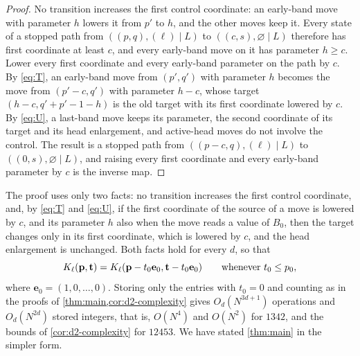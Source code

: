 \documentclass[11pt,reqno]{amsart}
\theoremstyle{definition}
\theoremstyle{remark}
\begin{document}
\begin{proof}
No transition increases the first control coordinate: an early-band move
with parameter $h$ lowers it from $p'$ to $h$, and the other moves keep it.
Every state of a stopped path from $((p,q),(\ell)\mid L)$ to
$((c,s),\varnothing\mid L)$ therefore has first coordinate at least $c$, and
every early-band move on it has parameter $h\geq c$.  Lower every first
coordinate and every early-band parameter on the path by $c$.  By
\eqref{eq:T}, an early-band move from $(p',q')$ with parameter $h$ becomes
the move from $(p'-c,q')$ with parameter $h-c$, whose target
$(h-c,q'+p'-1-h)$ is the old target with its first coordinate lowered by
$c$.  By \eqref{eq:U}, a last-band move keeps its parameter, the second
coordinate of its target and its head enlargement, and active-head moves do
not involve the control.  The result is a stopped path from
$((p-c,q),(\ell)\mid L)$ to $((0,s),\varnothing\mid L)$, and raising every
first coordinate and every early-band parameter by $c$ is the inverse map.
\end{proof}

The proof uses only two facts: no transition increases the first control
coordinate, and, by \eqref{eq:T} and \eqref{eq:U}, if the first coordinate
of the source of a move is lowered by $c$, and its parameter $h$ also when
the move reads a value of $B_0$, then the target changes only in its first
coordinate, which is lowered by $c$, and the head enlargement is unchanged.
Both facts hold for every $d$, so that
\[
 K_\ell(\mathbf p,\mathbf t)
 =K_\ell(\mathbf p-t_0\mathbf e_0,\mathbf t-t_0\mathbf e_0)
 \qquad\hbox{whenever }t_0\leq p_0,
\]
where $\mathbf e_0=(1,0,\ldots,0)$.  Storing only the entries with $t_0=0$
and counting as in the proofs of \cref{thm:main,cor:d2-complexity} gives
$O_d(N^{3d+1})$ operations and $O_d(N^{2d})$ stored integers, that is,
$O(N^4)$ and $O(N^2)$ for $1342$, and the bounds of \cref{cor:d2-complexity}
for $12453$.  We have stated \cref{thm:main} in the simpler form.
\end{document}

